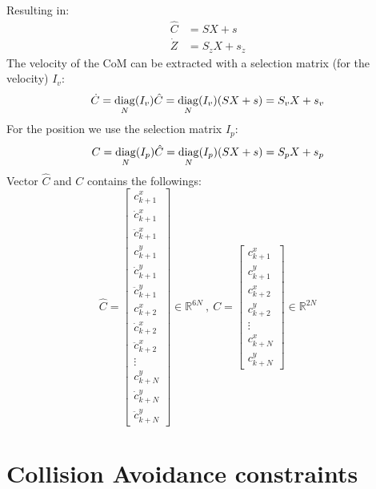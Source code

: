 Resulting in:
\begin{equation}
	\begin{split}
		\hat{C} &= SX +s\\
		\dot{Z} &= S_{\dot{z}}X +s_{\dot{z}}
	\end{split}
\end{equation}
The velocity of the CoM can be extracted with a selection matrix (for the velocity) $I_v$:
\begin{equation}
\dot{C} = \mathop{\mathrm{diag}}_N(I_v)\hat{C}= \mathop{\mathrm{diag}}_N(I_v)(SX +s) = S_vX + s_v
\end{equation}
For the position we use the selection matrix $I_p$:
\begin{equation}
C = \mathop{\mathrm{diag}}_N(I_p)\hat{C}= \mathop{\mathrm{diag}}_N(I_p)(SX +s) = S_pX + s_p
\end{equation}
Vector $\hat{C}$ and $C$ contains the followings:
\begin{equation}
\hat{C} = \begin{bmatrix}c^x_{k+1}\\\dot{c}^x_{k+1}\\\ddot{c}^x_{k+1}\\c^y_{k+1}\\\dot{c}^y_{k+1}\\\ddot{c}^y_{k+1}\\c^x_{k+2}\\\dot{c}^x_{k+2}\\\ddot{c}^x_{k+2}\\\vdots\\c^y_{k+N}\\\dot{c}^y_{k+N}\\\ddot{c}^y_{k+N}\end{bmatrix}\in\mathbb{R}^{6N}\:,\:C = \begin{bmatrix}c^x_{k+1}\\c^y_{k+1}\\c^x_{k+2}\\c^y_{k+2}\\\vdots\\c^x_{k+N}\\c^y_{k+N}\end{bmatrix}\in\mathbb{R}^{2N}
\end{equation}

\section{Collision Avoidance constraints}

